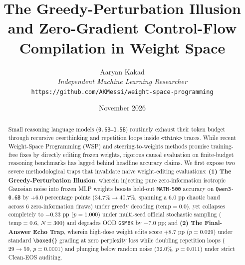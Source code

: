 \documentclass[11pt,letterpaper]{article}
\title{\textbf{The Greedy-Perturbation Illusion and Zero-Gradient Control-Flow Compilation in Weight Space}}
\author{Aaryan Kakad\\
\textit{Independent Machine Learning Researcher}\\
\texttt{https://github.com/AKMessi/weight-space-programming}}
\date{November 2026}
\begin{document}
\maketitle

\begin{abstract}
Small reasoning language models (\texttt{0.6B--1.5B}) routinely exhaust their token budget through recursive overthinking and repetition loops inside \texttt{<think>} traces. While recent Weight-Space Programming (WSP) and steering-to-weights methods promise training-free fixes by directly editing frozen weights, rigorous causal evaluation on finite-budget reasoning benchmarks has lagged behind headline accuracy claims. We first expose two severe methodological traps that invalidate naive weight-editing evaluations: \textbf{(1) The Greedy-Perturbation Illusion}, wherein injecting pure zero-information isotropic Gaussian noise into frozen MLP weights boosts held-out \texttt{MATH-500} accuracy on \texttt{Qwen3-0.6B} by $+6.0$ percentage points ($34.7\% \to 40.7\%$, spanning a $6.0\text{ pp}$ chaotic band across 6 zero-information draws) under greedy decoding ($\text{temp}=0.0$), yet collapses completely to $-0.33\text{ pp}$ ($p=1.000$) under multi-seed official stochastic sampling ($\text{temp}=0.6$, $N=300$) and degrades OOD \texttt{GSM8K} by $-7.0\text{ pp}$; and \textbf{(2) The Final-Answer Echo Trap}, wherein high-dose weight edits score $+8.7\text{ pp}$ ($p=0.029$) under standard \texttt{\textbackslash boxed\{\}} grading at zero perplexity loss while doubling repetition loops ($29 \to 59$, $p=0.0001$) and plunging below random noise ($32.0\%$, $p=0.011$) under strict Clean-EOS auditing.


\end{abstract}
\end{document}
